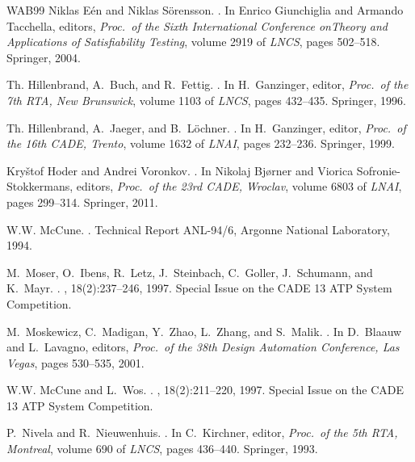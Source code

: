 \documentclass{report}
\begin{document}
\begin{thebibliography}{WAB{\etalchar{+}}99}
Niklas E{\'e}n and Niklas S{\"o}rensson.
.
\newblock In Enrico Giunchiglia and Armando Tacchella, editors, {\em Proc.\ of
  the Sixth International Conference onTheory and Applications of
  Satisfiability Testing}, volume 2919 of {\em LNCS}, pages 502--518. Springer,
  2004.

Th. Hillenbrand, A.~Buch, and R.~Fettig.
.
\newblock In H.~Ganzinger, editor, {\em Proc.\ of the 7th RTA, New Brunswick},
  volume 1103 of {\em LNCS}, pages 432--435. Springer, 1996.

Th. Hillenbrand, A.~Jaeger, and B.~L{\"o}chner.
.
\newblock In H.~Ganzinger, editor, {\em Proc.\ of the 16th CADE, Trento},
  volume 1632 of {\em LNAI}, pages 232--236. Springer, 1999.

Kry\v{s}tof Hoder and Andrei Voronkov.
.
\newblock In Nikolaj Bj{\o}rner and Viorica Sofronie-Stokkermans, editors, {\em
  Proc.\ of the 23rd CADE, Wroclav}, volume 6803 of {\em LNAI}, pages 299--314.
  Springer, 2011.

W.W. McCune.
.
\newblock Technical Report ANL-94/6, Argonne National Laboratory, 1994.

M.~Moser, O.~Ibens, R.~Letz, J.~Steinbach, C.~Goller, J.~Schumann, and K.~Mayr.
.
, 18(2):237--246, 1997.
\newblock Special Issue on the CADE 13 ATP System Competition.

M.~Moskewicz, C.~Madigan, Y.~Zhao, L.~Zhang, and S.~Malik.
.
\newblock In D.~Blaauw and L.~Lavagno, editors, {\em Proc.\ of the 38th Design
  Automation Conference, Las Vegas}, pages 530--535, 2001.

W.W. McCune and L.~Wos.
.
, 18(2):211--220, 1997.
\newblock Special Issue on the CADE 13 ATP System Competition.

P.~Nivela and R.~Nieuwenhuis.
.
\newblock In C.~Kirchner, editor, {\em Proc.\ of the 5th RTA, Montreal}, volume
  690 of {\em LNCS}, pages 436--440. Springer, 1993.


\end{thebibliography}
\end{document}
